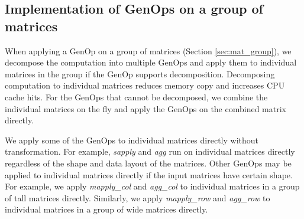 


\subsection{Implementation of GenOps on a group of matrices} \label{sec:group_op}

When applying a GenOp on a group of matrices (Section \ref{sec:mat_group}),
we decompose the computation into multiple GenOps and apply them to individual
matrices in the group if the GenOp supports decomposition. Decomposing computation
to individual matrices reduces memory copy and increases CPU cache hits.
For the GenOps that cannot be decomposed, we combine the individual matrices
on the fly and apply the GenOps on the combined matrix directly.

We apply some of the GenOps to individual matrices directly without
transformation. For example,
\textit{sapply} and \textit{agg} run on individual matrices directly regardless
of the shape and data layout of the matrices. Other GenOps may be applied
to individual matrices directly if the input matrices have certain shape. For
example, we apply \textit{mapply\_col} and \textit{agg\_col} to individual
matrices in a group of tall matrices directly.  Similarly, we apply
\textit{mapply\_row} and \textit{agg\_row} to
individual matrices in a group of wide matrices directly. %

